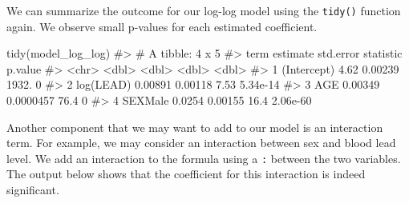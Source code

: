 \documentclass[
  letterpaper,
]{krantz}
\makeatletter
\newenvironment{Shaded}{\begin{snugshade}}{\end{snugshade}}
\newcommand{\CommentTok}[1]{\textcolor[rgb]{0.37,0.37,0.37}{#1}}
\newcommand{\FunctionTok}[1]{\textcolor[rgb]{0.28,0.35,0.67}{#1}}
\newcommand{\NormalTok}[1]{\textcolor[rgb]{0.00,0.23,0.31}{#1}}
\newenvironment{kframe}{%
\medskip{}
\setlength{\fboxsep}{.8em}
 \def\at@end@of@kframe{}%
 \ifinner\ifhmode%
  \def\at@end@of@kframe{\end{minipage}}%
  \begin{minipage}{\columnwidth}%
 \fi\fi%
 \def\FrameCommand##1{\hskip\@totalleftmargin \hskip-\fboxsep
 \colorbox{shadecolor}{##1}\hskip-\fboxsep
     \hskip-\linewidth \hskip-\@totalleftmargin \hskip\columnwidth}%
 \MakeFramed {\advance\hsize-\width
   \@totalleftmargin\z@ \linewidth\hsize
   \@setminipage}}%
 {\par\unskip\endMakeFramed%
 \at@end@of@kframe}
\renewenvironment{Shaded}{\begin{kframe}}{\end{kframe}}
\makeatother
\begin{document}
We can summarize the outcome for our log-log model using the
\texttt{tidy()} function again. We observe small p-values for each
estimated coefficient.

\begin{Shaded}
\begin{Highlighting}[]
\FunctionTok{tidy}\NormalTok{(model\_log\_log)}
\CommentTok{\#\textgreater{} \# A tibble: 4 x 5}
\CommentTok{\#\textgreater{}   term        estimate std.error statistic  p.value}
\CommentTok{\#\textgreater{}   \textless{}chr\textgreater{}          \textless{}dbl\textgreater{}     \textless{}dbl\textgreater{}     \textless{}dbl\textgreater{}    \textless{}dbl\textgreater{}}
\CommentTok{\#\textgreater{} 1 (Intercept)  4.62    0.00239     1932.   0       }
\CommentTok{\#\textgreater{} 2 log(LEAD)    0.00891 0.00118        7.53 5.34e{-}14}
\CommentTok{\#\textgreater{} 3 AGE          0.00349 0.0000457     76.4  0       }
\CommentTok{\#\textgreater{} 4 SEXMale      0.0254  0.00155       16.4  2.06e{-}60}
\end{Highlighting}
\end{Shaded}

Another component that we may want to add to our model is an interaction
term. For example, we may consider an interaction between sex and blood
lead level. We add an interaction to the formula using a \texttt{:}
between the two variables. The output below shows that the coefficient
for this interaction is indeed significant.
\end{document}
